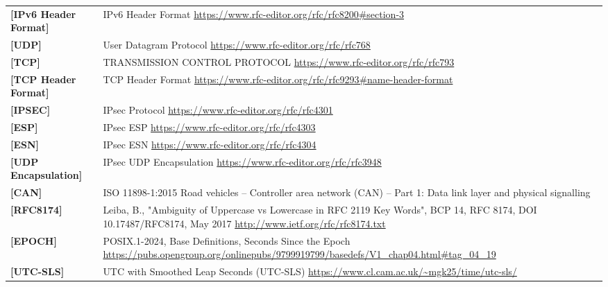 \begin{longtable}{l p{5in}}
	\label{intro:IPv6-Header-Format}\textbf{[IPv6 Header Format]} &
    IPv6 Header Format
	\newline\url{https://www.rfc-editor.org/rfc/rfc8200#section-3}\\
	\label{intro:UDP}\textbf{[UDP]} &
    User Datagram Protocol
	\newline\url{https://www.rfc-editor.org/rfc/rfc768}\\
	\label{intro:TCP}\textbf{[TCP]} &
    TRANSMISSION CONTROL PROTOCOL
	\newline\url{https://www.rfc-editor.org/rfc/rfc793}\\
	\label{intro:TCP-Header-Format}\textbf{[TCP Header Format]} &
    TCP Header Format
	\newline\url{https://www.rfc-editor.org/rfc/rfc9293#name-header-format}\\
	\label{intro:IPSEC}\textbf{[IPSEC]} &
    IPsec Protocol
	\newline\url{https://www.rfc-editor.org/rfc/rfc4301}\\
	\label{intro:ESP}\textbf{[ESP]} &
    IPsec ESP
	\newline\url{https://www.rfc-editor.org/rfc/rfc4303}\\
	\label{intro:ESN}\textbf{[ESN]} &
    IPsec ESN
	\newline\url{https://www.rfc-editor.org/rfc/rfc4304}\\
	\label{intro:UDP-Encapsulation}\textbf{[UDP Encapsulation]} &
    IPsec UDP Encapsulation
	\newline\url{https://www.rfc-editor.org/rfc/rfc3948}\\
	\label{intro:CAN}\textbf{[CAN]} &
    ISO 11898-1:2015 Road vehicles -- Controller area network (CAN) -- Part 1: Data link layer and physical signalling\\
	\label{intro:rfc8174}\textbf{[RFC8174]} &
    Leiba, B., "Ambiguity of Uppercase vs Lowercase in RFC 2119 Key Words", BCP
    14, RFC 8174, DOI 10.17487/RFC8174, May 2017
        \newline\url{http://www.ietf.org/rfc/rfc8174.txt}\\
	\label{intro:EPOCH}\textbf{[EPOCH]} &
    POSIX.1-2024, Base Definitions, Seconds Since the Epoch
	\newline\url{https://pubs.opengroup.org/onlinepubs/9799919799/basedefs/V1_chap04.html#tag_04_19}\\
	\label{intro:UTC-SLS}\textbf{[UTC-SLS]} &
    UTC with Smoothed Leap Seconds (UTC-SLS)
	\newline\url{https://www.cl.cam.ac.uk/~mgk25/time/utc-sls/}\\
\end{longtable}

